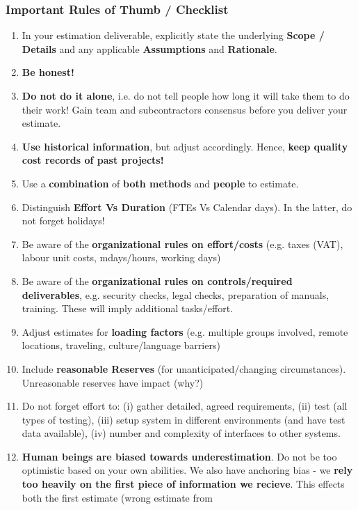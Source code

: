 \documentclass[]{project_plan}
\begin{document}
\subsubsection{Important Rules of Thumb / Checklist}
\begin{enumerate}
  \item In your estimation deliverable, explicitly state the underlying \textbf{Scope / Details} and any applicable \textbf{Assumptions} and \textbf{Rationale}.
  \item \textbf{Be honest!}
  \item \textbf{Do not do it alone}, i.e. do not tell people how long it will take them to do their work! Gain team and subcontractors
        consensus before you deliver your estimate.
  \item \textbf{Use historical information}, but adjust accordingly. Hence, \textbf{keep quality cost records of past projects!}
  \item Use a \textbf{combination} of \textbf{both methods} and \textbf{people} to estimate.
  \item Distinguish \textbf{Effort Vs Duration} (FTEs Vs Calendar days). In the latter, do not forget holidays!
  \item Be aware of the \textbf{organizational rules on effort/costs} (e.g. taxes (VAT), labour unit costs, mdays/hours, working days)
  \item Be aware of the \textbf{organizational rules on controls/required deliverables}, e.g. security checks, legal checks, preparation of
        manuals, training. These will imply additional tasks/effort.
  \item Adjust estimates for \textbf{loading factors} (e.g. multiple groups involved, remote locations, traveling, culture/language barriers)
  \item Include \textbf{reasonable Reserves} (for unanticipated/changing circumstances). Unreasonable reserves have impact (why?)
  \item Do not forget effort to: (i) gather detailed, agreed requirements, (ii) test (all types of testing), (iii) setup system in different
        environments (and have test data available), (iv) number and complexity of interfaces to other systems.
  \item \textbf{Human beings are biased towards underestimation}. Do not be too optimistic based on your own abilities. We also have anchoring
        bias - we \textbf{rely too heavily on the first piece of information we recieve}. This effects both the first estimate (wrong estimate from

\end{enumerate}
\end{document}
